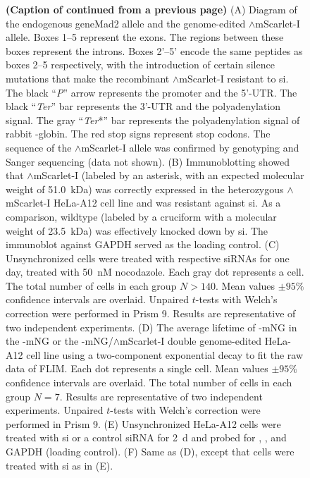 \begin{figure}
    \noindent\justifying \textbf{(Caption of  continued from a previous page)} (A) Diagram of the endogenous gene{Mad2} allele and the genome-edited $\wedge$mScarlet-I allele. Boxes 1--5 represent the exons. The regions between these boxes represent the introns. Boxes 2'--5' encode the same peptides as boxes 2--5 respectively, with the introduction of certain silence mutations that make the recombinant $\wedge$mScarlet-I resistant to si. The black ``\textit{P}'' arrow represents the promoter and the 5'-UTR. The black ``\textit{Ter}'' bar represents the 3'-UTR and the polyadenylation signal. The gray ``\textit{Ter}*'' bar represents the polyadenylation signal of rabbit \textbeta{}-globin. The red stop signs represent stop codons. The sequence of the $\wedge$mScarlet-I allele was confirmed by genotyping and Sanger sequencing (data not shown). (B) Immunoblotting showed that $\wedge$mScarlet-I (labeled by an asterisk, with an expected molecular weight of \SI{51.0}{kDa}) was correctly expressed in the heterozygous $\wedge$mScarlet-I HeLa-A12 cell line and was resistant against si. As a comparison, wildtype  (labeled by a cruciform with a molecular weight of \SI{23.5}{kDa}) was effectively knocked down by si. The immunoblot against GAPDH served as the loading control. (C) Unsynchronized cells were treated with respective siRNAs for one day, treated with \SI{50}{nM} nocodazole. Each gray dot represents a cell. The total number of cells in each group $N > 140$. Mean values $\pm 95\%$ confidence intervals are overlaid. Unpaired $t$-tests with Welch's correction were performed in Prism 9. Results are representative of two independent experiments. (D) The average lifetime of -mNG in the -mNG or the -mNG/$\wedge$mScarlet-I double genome-edited HeLa-A12 cell  line using a two-component exponential decay to fit the raw data of FLIM. Each dot represents a single cell. Mean values $\pm 95\%$ confidence intervals are overlaid. The total number of cells in each group $N = 7$. Results are representative of two independent experiments. Unpaired $t$-tests with Welch's correction were performed in Prism 9. (E) Unsynchronized HeLa-A12 cells were treated with si or a control siRNA for \SI{2}{d} and probed for , , and GAPDH (loading control). (F) Same as (D), except that cells were treated with si as in (E).
\end{figure}


